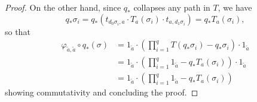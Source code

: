 \begin{prop}
\begin{proof}
        On the other hand, since $q_*$ collapses any path in $T$, we have 
        \[q_*\sigma_i = q_*(t_{d_0\sigma_i, a} \cdot T_a(\sigma_i) \cdot t_{a, d_1\sigma_i}) = q_*T_a(\sigma_i),\]
        so that 
        \begin{equation*}
        \begin{split}
        \varphi_{\tilde{a},\tilde{a}}\circ q_*(\sigma) &= 1_{\tilde{a}} \cdot (\prod_{i=1}^q T(q_*\sigma_i) - q_*\sigma_i) \cdot 1_{\tilde{a}} \\
        &= 1_{\tilde{a}} \cdot  (\prod_{i=1}^q 1_{\tilde{a}} - q_*T_a(\sigma_i)) \cdot 1_{\tilde{a}}  \\
        &= 1_{\tilde{a}} \cdot  (\prod_{i=1}^q 1_{\tilde{a}} - q_*T_a(\sigma_i))
        \end{split}
        \end{equation*} 
        showing commutativity and concluding the proof.  
        \end{proof}
    \end{prop}

